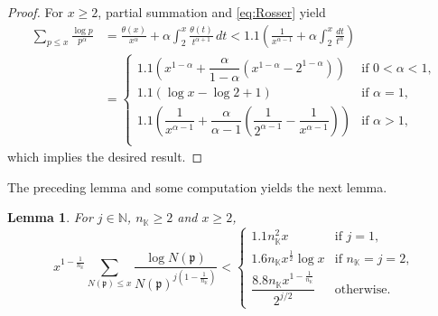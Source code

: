 \documentclass[10pt,reqno]{amsart}
\theoremstyle{plain}
\newtheorem{lemma}[theorem]{Lemma}
\theoremstyle{definition}
\newcommand{\N}{\mathbb{N}}
\newcommand{\K}{\mathbb{K}}
\newcommand{\PP}{\mathfrak{p}}
\begin{document}
\begin{proof}
    For $x \geq 2$, partial summation and \eqref{eq:Rosser} yield 
    \begin{align*}
        \sum_{p\leq x} \frac{\log p}{p^{\alpha}}
        &= \frac{\theta(x)}{x^{\alpha}} + \alpha\int_2^x \frac{\theta(t)}{t^{\alpha+1}}\,dt 
        < 1.1\left( \frac{1}{x^{\alpha-1}} + \alpha \int_2^x \frac{dt}{t^{\alpha}} \right) \\
        &=
        \begin{cases}
            1.1 \left( x^{1-\alpha} + \dfrac{\alpha}{1-\alpha} \left( x^{1-\alpha} - 2^{1-\alpha} \right) \right)  & \text{if $0<\alpha < 1$},\\[10pt]
            1.1 (\log x - \log 2 + 1) & \text{if $\alpha=1$},\\[5pt]
            1.1 \left(\dfrac{1}{x^{\alpha-1}} + \dfrac{\alpha}{\alpha - 1} \left( \dfrac{1}{2^{\alpha-1}} - \dfrac{1}{x^{\alpha-1}} \right) \right)  & \text{if $\alpha > 1$},\\
        \end{cases}
    \end{align*}
    which implies the desired result.
\end{proof}

The preceding lemma and some computation yields the next lemma.

\begin{lemma}\label{Lemma:Multipart}
    For $j \in \N$, $n_{\K}\geq 2$ and $x \geq 2$,
    \begin{equation*}
        x^{1 - \frac{1}{n_{\K}}} \!\!\! \sum_{N(\PP)\leq x} \frac{\log N(\PP)}{N(\PP)^{j (1- \frac{1}{n_{\K}})}}
        <
        \begin{cases}
       1.1 n_{\K}^2 x & \text{if $j =1$},\\[5pt] 
        1.6n_{\K}x^{ \frac{1}{2} }  \log x & \text{if $n_{\K}=j =2$},\\[5pt]
        \dfrac{8.8n_{\K} x^{1 - \frac{1}{n_{\K}}} }{2^{j /2}} & \text{otherwise}.
    \end{cases}
\end{equation*}
\end{lemma}
\end{document}
